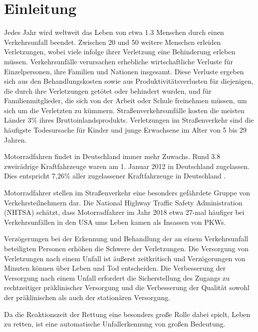 \chapter{Einleitung}
%
%
%
%
%
%
Jedes Jahr wird weltweit das Leben von etwa \SI{1,3}{\Million} Menschen durch einen Verkehrsunfall beendet. Zwischen \SI{20}{\Million} und \SI{50}{\Million} weitere Menschen erleiden Verletzungen, wobei viele infolge ihrer Verletzung eine Behinderung erleben müssen. Verkehrsunfälle verursachen erhebliche wirtschaftliche Verluste für Einzelpersonen, ihre Familien und Nationen insgesamt. Diese Verluste ergeben sich aus den Behandlungskosten sowie aus Produktivitätsverlusten für diejenigen, die durch ihre Verletzungen getötet oder behindert wurden, und für Familienmitglieder, die sich von der Arbeit oder Schule freinehmen müssen, um sich um die Verletzten zu kümmern. Straßenverkehrsunfälle kosten die meisten Länder 3\% ihres Bruttoinlandsprodukts. Verletzungen im Straßenverkehr sind die häufigste Todesursache für Kinder und junge Erwachsene im Alter von 5 bis 29 Jahren.\citep{healthorganization2022}

Motorradfahren findet in Deutschland immer mehr Zuwachs.  Rund \SI{3,8}{\Million} zwei\-rädrige Kraftfahrzeuge waren am 1. Januar 2012 in Deutschland zugelassen. Dies entspricht 7,26\% aller zugelassener Kraftfahrzeuge in Deutschland \citep{Haedrich2012}.

Motorradfahrer stellen im Straßenverkehr eine besonders gefährdete Gruppe von Verkehrsteilnehmern dar. Die National Highway Traffic Safety Administration (NHTSA) schätzt, dass Motorradfahrer im Jahr 2018 etwa 27-mal häufiger bei Verkehrsunfällen in den USA ums Leben kamen als Insassen von PKWs\citep{NHTSA}.

Verzögerungen bei der Erkennung und Behandlung der an einem Verkehrsunfall beteiligten Personen erhöhen die Schwere der Verletzungen. Die Versorgung von Verletzungen nach einem Unfall ist äußerst zeitkritisch und Verzögerungen von Minuten können über Leben und Tod entscheiden. Die Verbesserung der Versorgung nach einem Unfall erfordert die Sicherstellung des Zugangs zu rechtzeitiger präklinischer Versorgung und die Verbesserung der Qualität sowohl der präklinischen als auch der stationären Versorgung.\citep{healthorganization2022}

Da die Reaktionszeit der Rettung eine besonders große Rolle dabei spielt, Leben zu retten, ist eine automatische Unfallerkennung von großen Bedeutung.

